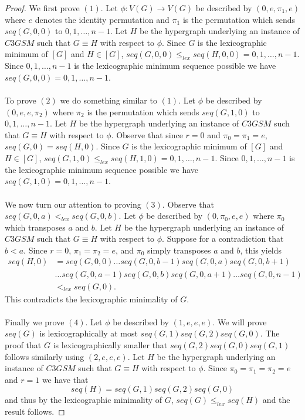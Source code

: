 \begin{proof}
We first prove $(1)$. Let $\phi : V(G) \rightarrow V(G)$ be described by $(0,e,\pi_1, e)$ where $e$ denotes the identity permutation and $\pi_1$ is the permutation which sends $seq(G,0,0)$ to $0,1,\dots,n-1$. Let $H$ be the hypergraph underlying an instance of $C3GSM$ such that $G \equiv H$ with respect to $\phi$. Since $G$ is the lexicographic minimum of $[G]$ and $H \in [G]$, $seq(G,0,0) \leq_{lex} seq(H,0,0) = 0,1,\dots,n-1$. Since $0,1,\dots,n-1$ is the lexicographic minimum sequence possible we have $seq(G,0,0) = 0,1,\dots,n-1$.
\paragraph{}
To prove $(2)$ we do something similar to $(1)$. Let $\phi$ be described by $(0,e,e,\pi_2)$ where $\pi_2$ is the permutation which sends $seq(G,1,0)$ to $0,1,\dots,n-1$. Let $H$ be the hypergraph underlying an instance of $C3GSM$ such that $G \equiv H$ with respect to $\phi$. Observe that since $r = 0$ and $\pi_0 = \pi_1 = e$, $seq(G,0) = seq(H,0)$. Since $G$ is the lexicographic minimum of $[G]$ and $H \in [G]$, $seq(G,1,0) \leq_{lex} seq(H,1,0) = 0,1,\dots,n-1$. Since $0,1,\dots,n-1$ is the lexicographic minimum sequence possible we have $seq(G,1,0) = 0,1,\dots,n-1$.
\paragraph{}
We now turn our attention to proving $(3)$. Observe that $seq(G,0,a) <_{lex} seq(G,0,b)$. Let $\phi$ be described by $(0,\pi_0,e,e)$ where $\pi_0$ which transposes $a$ and $b$. Let $H$ be the hypergraph underlying an instance of $C3GSM$ such that $G \equiv H$ with respect to $\phi$. Suppose for a contradiction that $b<a$. Since $r=0$, $\pi_1=\pi_2=e$, and $\pi_0$ simply transposes $a$ and $b$, this yields 
\begin{align*}seq(H,0) &= seq(G,0,0) \dots seq(G,0,b-1)seq(G,0,a)seq(G,0,b+1)\\
&\dots seq(G,0,a-1) seq(G,0,b) seq(G,0,a+1) \dots seq(G,0,n-1) \\
&<_{lex} seq(G,0).\end{align*}
This contradicts the lexicographic minimality of $G$.
\paragraph{}
Finally we prove $(4)$. Let $\phi$ be described by $(1,e,e,e)$. We will prove $seq(G)$ is lexicographically at most $seq(G,1)seq(G,2)seq(G,0)$. The proof that $G$ is lexicographically smaller that $seq(G,2)seq(G,0)seq(G,1)$ follows similarly using $(2,e,e,e)$. Let $H$ be the hypergraph underlying an instance of $C3GSM$ such that $G \equiv H$ with respect to $\phi$. Since $\pi_0=\pi_1=\pi_2=e$ and $r=1$ we have that
$$seq(H) = seq(G,1)seq(G,2)seq(G,0)$$
and thus by the lexicographic minimality of $G$, $seq(G) \leq_{lex} seq(H)$ and the result follows.
\end{proof}
